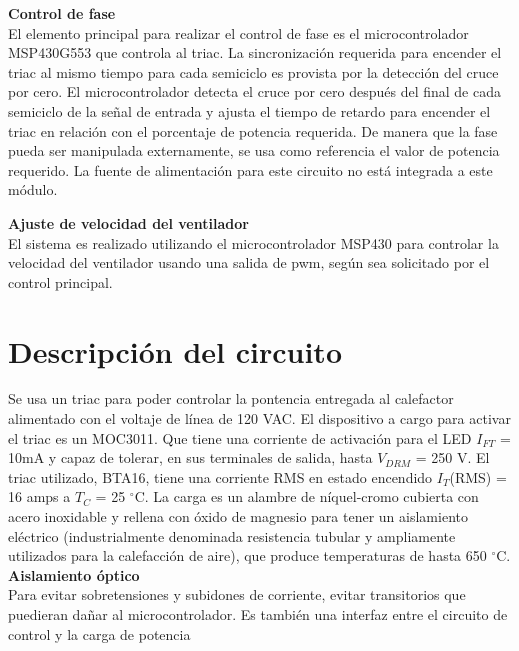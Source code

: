 \documentclass{article}
\begin{document}
        \textbf{Control de fase}\\    
        El elemento principal para realizar el control de fase es el microcontrolador  MSP430G553 que controla al triac.
        La sincronizaci\'on requerida para encender el triac al mismo tiempo para cada semiciclo es provista por la detecci\'on del cruce por cero.
        El microcontrolador detecta el cruce por cero despu\'es del final de cada semiciclo de la se\~nal de entrada y ajusta el tiempo de retardo para encender el triac en relaci\'on con el porcentaje de potencia requerida.
        De manera que la fase pueda ser manipulada externamente, se usa como referencia el valor de potencia requerido.
        La fuente de alimentaci\'on para este circuito no est\'a integrada a este m\'odulo.
    
        \textbf{Ajuste de velocidad del ventilador}\\
        El sistema es realizado utilizando el microcontrolador MSP430 para controlar la velocidad del ventilador usando una salida de pwm, según sea solicitado por el control principal.\\


    \section{Descripci\'on del circuito}
    
    Se usa un triac para poder controlar la pontencia entregada al calefactor alimentado con el voltaje de l\'inea de 120 VAC. El dispositivo a cargo para activar el triac es un MOC3011. Que tiene una corriente de activaci\'on para el LED $I_{FT}$ = 10mA y capaz de tolerar, en sus terminales de salida, hasta $V_{DRM}$ = 250 V. El triac utilizado, BTA16, tiene una corriente RMS en estado encendido $I_{T}$(RMS) = 16 amps a $T_C$ = 25 $^\circ$C. La carga es un alambre de n\'iquel-cromo cubierta con acero inoxidable y rellena con \'oxido de magnesio para tener un aislamiento el\'ectrico (industrialmente denominada resistencia tubular y ampliamente utilizados para la calefacci\'on de aire), que produce temperaturas de hasta 650 $^\circ$C.\\

        \textbf{Aislamiento óptico}\\
        Para evitar sobretensiones y subidones de corriente, evitar transitorios que puedieran dañar al microcontrolador. Es tambi\'en una interfaz entre el circuito de control y la carga de potencia\\
\end{document}
